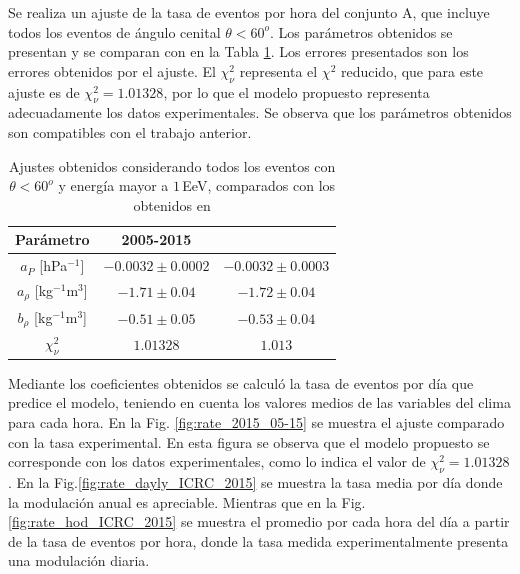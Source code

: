         Se realiza un ajuste de la tasa de eventos por hora del conjunto A, que incluye todos los eventos de ángulo cenital $\theta< 60^o$. Los parámetros obtenidos se presentan y se comparan con \cite{aab2017impact} en la Tabla \ref{tabla:parametros_ICRC_2015}. Los errores presentados son los errores obtenidos por el ajuste. El $\chi^2_\nu$ representa el $\chi^2$ reducido, que para este ajuste es de $\chi^2_\nu=1.01328$, por lo que el modelo propuesto representa adecuadamente los datos experimentales. Se observa que los parámetros obtenidos son compatibles con el trabajo anterior.
        \begin{table}[H]
            \centering
            \begin{tabular}{|c|c|c|}
            \hline
            \textbf{Parámetro}          & \textbf{2005-2015}            & \textbf{\cite{aab2017impact}}     \\ \hline
            $a_P$ [hPa$^{-1}$]          & $-0.0032 \pm 0.0002$          & $-0.0032 \pm 0.0003$              \\ \hline
            $a_\rho$ [kg$^{-1}$m$^3$]   & $-1.71 \pm 0.04 $             & $-1.72 \pm 0.04$                  \\ \hline
            $b_\rho$ [kg$^{-1}$m$^3$]   & $-0.51 \pm 0.05$              & $-0.53 \pm 0.04$                  \\ \hline
            $\chi^2_\nu$                & $1.01328$                     & $1.013$                         \\   \hline
            \end{tabular} 
            \caption{Ajustes obtenidos considerando todos los eventos con $\theta<60^o$ y energía mayor a $1\,$EeV, comparados con los obtenidos en \cite{aab2017impact}} \label{tabla:parametros_ICRC_2015}
        \end{table}

        Mediante los coeficientes obtenidos se calculó la tasa de eventos por día que predice el modelo, teniendo en cuenta los valores medios de las variables del clima para cada hora. En la Fig. \ref{fig:rate_2015_05-15} se muestra el ajuste comparado con la tasa experimental. En esta figura se observa que el modelo propuesto se corresponde con los datos experimentales, como lo indica el valor de $\chi^2_\nu=1.01328$. En la Fig.\ref{fig:rate_dayly_ICRC_2015} se muestra la tasa media por día donde la modulación anual es apreciable. Mientras que en la Fig.\ref{fig:rate_hod_ICRC_2015} se muestra el promedio por cada hora del día a partir de la tasa de eventos por hora, donde la tasa medida experimentalmente presenta una modulación diaria.  

